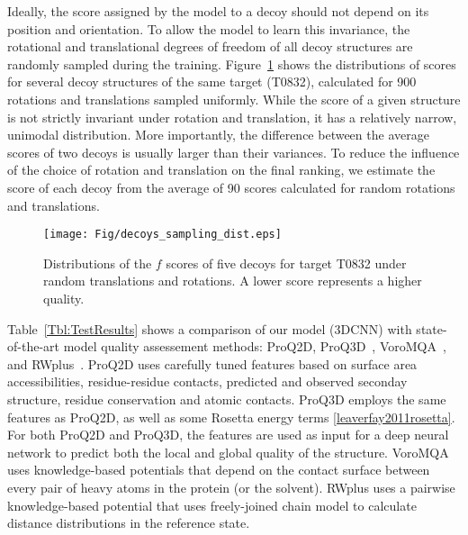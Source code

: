 Ideally, the score assigned by the model to a decoy should not depend
on its position and orientation.  To allow the model to learn this
invariance, the rotational and translational degrees of freedom of all
decoy structures are randomly sampled during the training.
%
Figure~\ref{Fig:DecoysScoreDistribution} shows the distributions of
scores for several decoy structures of the same target (T0832),
calculated for 900 rotations and translations sampled uniformly.
While the score of a given structure is not strictly invariant under
rotation and translation, it has a relatively narrow, unimodal
distribution.  More importantly, the difference between the average
scores of two decoys is usually larger than their variances. To reduce
the influence of the choice of rotation and translation on the final
ranking, we estimate the score of each decoy from the average of 90
scores calculated for random rotations and translations.

\begin{figure}[H]
    \centering
    \texttt{[image: Fig/decoys\_sampling\_dist.eps]}
%
    \caption{Distributions of the $f$ scores of five decoys for target
    T0832 under random translations and rotations. A lower score
    represents a higher quality.}
%
    \label{Fig:DecoysScoreDistribution}
\end{figure}

Table~\ref{Tbl:TestResults} shows a comparison of our model (3DCNN)
with state-of-the-art model quality assessement methods: ProQ2D,
ProQ3D~\cite{uziela2017proq3d}, VoroMQA~\cite{olechnovivc2017voromqa},
and RWplus~\cite{zhang2010novel}.
%
ProQ2D uses carefully tuned features based on surface area
accessibilities, residue-residue contacts, predicted and observed
seconday structure, residue conservation and atomic contacts. ProQ3D
employs the same features as ProQ2D, as well as some Rosetta energy
terms \ref{leaverfay2011rosetta}. For both ProQ2D and ProQ3D, the
features are used as input for a deep neural network to predict both
the local and global quality of the structure.
%
VoroMQA uses knowledge-based potentials that depend on the contact
surface between every pair of heavy atoms in the protein (or the
solvent).
%
RWplus uses a pairwise knowledge-based potential that uses
freely-joined chain model to calculate distance distributions in the
reference state.



